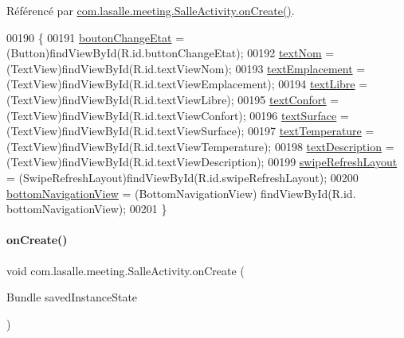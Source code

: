 Référencé par \hyperlink{_salle_activity_8java_source_l00060}{com.\+lasalle.\+meeting.\+Salle\+Activity.\+on\+Create()}.


\begin{DoxyCode}
00190     \{
00191         \hyperlink{classcom_1_1lasalle_1_1meeting_1_1_salle_activity_a0c33eac55429431e84849eca22ad3916}{boutonChangeEtat} = (Button)findViewById(R.id.buttonChangeEtat);
00192         \hyperlink{classcom_1_1lasalle_1_1meeting_1_1_salle_activity_acb7acab3be7f76509ac3de29e715e008}{textNom} = (TextView)findViewById(R.id.textViewNom);
00193         \hyperlink{classcom_1_1lasalle_1_1meeting_1_1_salle_activity_a3e7b6e7c522546e84409d3b658985ca8}{textEmplacement} = (TextView)findViewById(R.id.textViewEmplacement);
00194         \hyperlink{classcom_1_1lasalle_1_1meeting_1_1_salle_activity_a3d80063be535c4f343498d1d0616092d}{textLibre} = (TextView)findViewById(R.id.textViewLibre);
00195         \hyperlink{classcom_1_1lasalle_1_1meeting_1_1_salle_activity_a9b647a7aaf2aab7a9e74cb525c250545}{textConfort} = (TextView)findViewById(R.id.textViewConfort);
00196         \hyperlink{classcom_1_1lasalle_1_1meeting_1_1_salle_activity_a0fb3dcfded70ba78d8ce46a507ff7ef2}{textSurface} = (TextView)findViewById(R.id.textViewSurface);
00197         \hyperlink{classcom_1_1lasalle_1_1meeting_1_1_salle_activity_a234ef25278aeb3164d379158fc294283}{textTemperature} = (TextView)findViewById(R.id.textViewTemperature);
00198         \hyperlink{classcom_1_1lasalle_1_1meeting_1_1_salle_activity_acc3b8d915861076b132cdc33f4d9f298}{textDescription} = (TextView)findViewById(R.id.textViewDescription);
00199         \hyperlink{classcom_1_1lasalle_1_1meeting_1_1_salle_activity_aa331ece163b959f06fae00a637d37cb4}{swipeRefreshLayout} = (SwipeRefreshLayout)findViewById(R.id.swipeRefreshLayout);
00200         \hyperlink{classcom_1_1lasalle_1_1meeting_1_1_salle_activity_a43f122362683c363d7eee1b1f1dfd581}{bottomNavigationView} = (BottomNavigationView) findViewById(R.id.
      bottomNavigationView);
00201     \}
\end{DoxyCode}
\mbox{\label{classcom_1_1lasalle_1_1meeting_1_1_salle_activity_a42079164af7344cb01a22eab03d2022f}} 
\paragraph{\texorpdfstring{on\+Create()}{onCreate()}}
{\footnotesize\ttfamily void com.\+lasalle.\+meeting.\+Salle\+Activity.\+on\+Create (\begin{DoxyParamCaption}\item[{Bundle}]{saved\+Instance\+State }\end{DoxyParamCaption})\hspace{0.3cm}{\ttfamily [protected]}}



